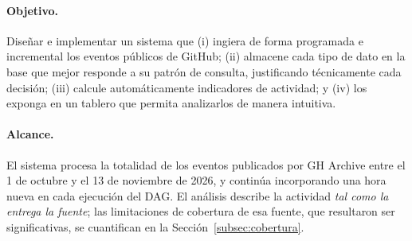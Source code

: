 \paragraph{Objetivo.} Diseñar e implementar un sistema que (i) ingiera de forma programada e incremental los eventos públicos de GitHub; (ii) almacene cada tipo de dato en la base que mejor responde a su patrón de consulta, justificando técnicamente cada decisión; (iii) calcule automáticamente indicadores de actividad; y (iv) los exponga en un tablero que permita analizarlos de manera intuitiva.

\paragraph{Alcance.} El sistema procesa la totalidad de los eventos publicados por GH Archive entre el 1 de octubre y el 13 de noviembre de 2026, y continúa incorporando una hora nueva en cada ejecución del DAG. El análisis describe la actividad \textit{tal como la entrega la fuente}; las limitaciones de cobertura de esa fuente, que resultaron ser significativas, se cuantifican en la Sección~\ref{subsec:cobertura}.
